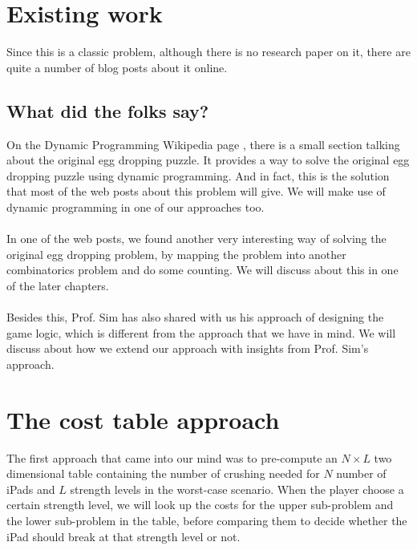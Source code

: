 \documentclass[12pt,a4paper,oneside]{report}
\begin{document}

\chapter{Existing work}
Since this is a classic problem, although there is no research paper on it, there are quite a number of blog posts about it online.

\section{What did the folks say?}
On the Dynamic Programming Wikipedia page \cite{dpwiki}, there is a small section talking about the original egg dropping puzzle. It provides a way to solve the original egg dropping puzzle using dynamic programming. And in fact, this is the solution that most of the web posts about this problem will give. We will make use of dynamic programming in one of our approaches too. \\\\
In one of the web posts, we found another very interesting way of solving the original egg dropping problem, by mapping the problem into another combinatorics problem and do some counting. We will discuss about this in one of the later chapters. \\\\
Besides this, Prof. Sim has also shared with us his approach of designing the game logic, which is different from the approach that we have in mind. We will discuss about how we extend our approach with insights from Prof. Sim's approach. 


\chapter{The cost table approach}
The first approach that came into our mind was to pre-compute an $N \times L$ two dimensional table containing the number of crushing needed for $N$ number of iPads and $L$ strength levels in the worst-case scenario. When the player choose a certain strength level, we will look up the costs for the upper sub-problem and the lower sub-problem in the table, before comparing them to decide whether the iPad should break at that strength level or not.
\end{document}
